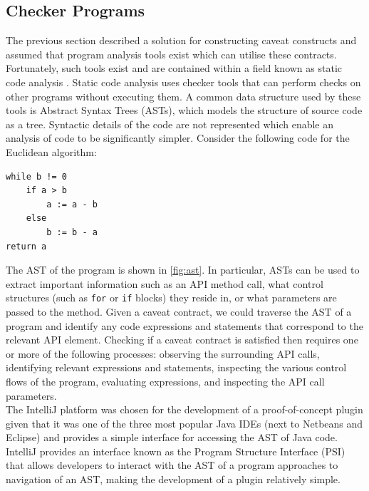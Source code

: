 \subsection{Checker Programs}
\label{sec:code-checker}
The previous section described a solution for constructing caveat constructs and assumed that program analysis tools exist which can utilise these contracts. Fortunately, such tools exist and are contained within a field known as static code analysis \cite{1657940}. Static code analysis uses checker tools that can perform checks on other programs without executing them. A common data structure used by these tools is Abstract Syntax Trees (ASTs), which models the structure of source code as a tree. Syntactic details of the code are not represented which enable an analysis of code to be significantly simpler. Consider the following code for the Euclidean algorithm:

\begin{verbatim}
while b != 0
    if a > b
        a := a - b
    else
        b := b - a
return a
\end{verbatim}

The AST of the program is shown in \ref{fig:ast}. In particular, ASTs can be used to extract important information such as an API method call, what control structures (such as \lstinline{for} or \lstinline{if} blocks) they reside in, or what parameters are passed to the method. Given a caveat contract, we could traverse the AST of a program and identify any code expressions and statements that correspond to the relevant API element. Checking if a caveat contract is satisfied then requires one or more of the following processes: observing the surrounding API calls, identifying relevant expressions and statements, inspecting the various control flows of the program, evaluating expressions, and inspecting the API call parameters. \\
The IntelliJ platform was chosen for the development of a proof-of-concept plugin given that it was one of the three most popular Java IDEs (next to Netbeans and Eclipse) and provides a simple interface for accessing the AST of Java code. IntelliJ provides an interface known as the Program Structure Interface (PSI) that allows developers to interact with the AST of a program approaches to navigation of an AST, making the development of a plugin relatively simple.


